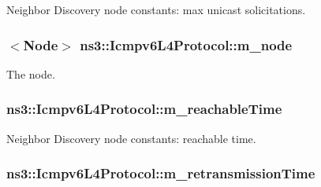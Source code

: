 Neighbor Discovery node constants\+: max unicast solicitations. 

\subsubsection[{\texorpdfstring{m\+\_\+node}{m_node}}]{$<${\bf Node}$>$ ns3\+::\+Icmpv6\+L4\+Protocol\+::m\+\_\+node\hspace{0.3cm}{\ttfamily [private]}}\hypertarget{classns3_1_1Icmpv6L4Protocol_a8968d1631f94f0b1cc1fd0e71ea0d0fe}{}\label{classns3_1_1Icmpv6L4Protocol_a8968d1631f94f0b1cc1fd0e71ea0d0fe}


The node. 

\subsubsection[{\texorpdfstring{m\+\_\+reachable\+Time}{m_reachableTime}}]{ ns3\+::\+Icmpv6\+L4\+Protocol\+::m\+\_\+reachable\+Time\hspace{0.3cm}{\ttfamily [private]}}\hypertarget{classns3_1_1Icmpv6L4Protocol_a18fdc8ec4b55d2192edffb949e89f593}{}\label{classns3_1_1Icmpv6L4Protocol_a18fdc8ec4b55d2192edffb949e89f593}


Neighbor Discovery node constants\+: reachable time. 

\subsubsection[{\texorpdfstring{m\+\_\+retransmission\+Time}{m_retransmissionTime}}]{ ns3\+::\+Icmpv6\+L4\+Protocol\+::m\+\_\+retransmission\+Time\hspace{0.3cm}{\ttfamily [private]}}\hypertarget{classns3_1_1Icmpv6L4Protocol_ab06c636fc6de4e1deefb8e9e53bd0dd4}{}\label{classns3_1_1Icmpv6L4Protocol_ab06c636fc6de4e1deefb8e9e53bd0dd4}


